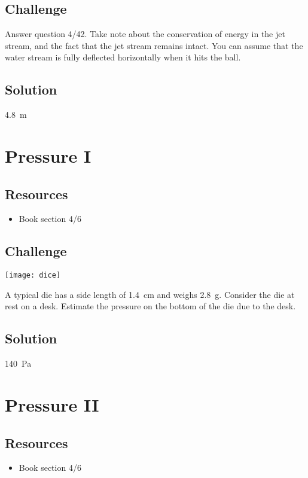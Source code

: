 \subsection*{Challenge}
Answer question 4/42. Take note about the conservation of energy in the jet stream, and the fact that the jet stream remains intact. You can assume that the water stream is fully deflected horizontally when it hits the ball.

\subsection*{Solution}
\SI{4.8}{\meter}




\newpage
\section{Pressure I}

\subsection*{Resources}
\begin{itemize}
    \item Book section 4/6
\end{itemize}

\subsection*{Challenge}
\texttt{[image: dice]}

A typical die has a side length of \SI{1.4}{\cm} and weighs \SI{2.8}{\gram}. Consider the die at rest on a desk. Estimate the pressure on the bottom of the die due to the desk.

\subsection*{Solution}
\SI{140}{\pascal}




\newpage
\section{Pressure II}

\subsection*{Resources}
\begin{itemize}
    \item Book section 4/6
\end{itemize}

